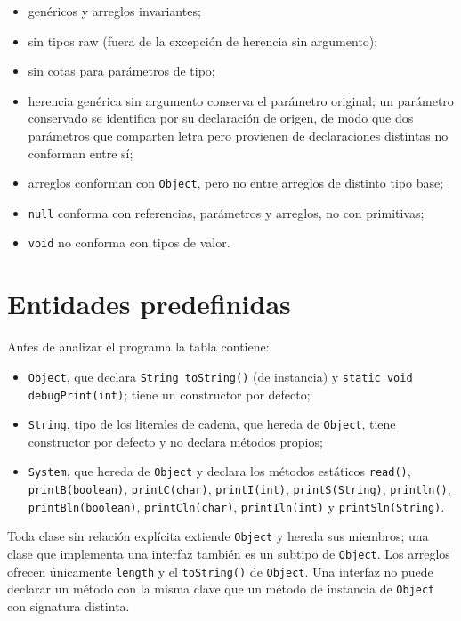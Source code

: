 \documentclass[11pt,a4paper]{article}
\begin{document}
\begin{itemize}
  \item genéricos y arreglos invariantes;
  \item sin tipos raw (fuera de la excepción de herencia sin argumento);
  \item sin cotas para parámetros de tipo;
  \item herencia genérica sin argumento conserva el parámetro original; un
        parámetro conservado se identifica por su declaración de origen, de modo
        que dos parámetros que comparten letra pero provienen de declaraciones
        distintas no conforman entre sí;
  \item arreglos conforman con \texttt{Object}, pero no entre arreglos de distinto
        tipo base;
  \item \texttt{null} conforma con referencias, parámetros y arreglos, no con
        primitivas;
  \item \texttt{void} no conforma con tipos de valor.
\end{itemize}

\section{Entidades predefinidas}

Antes de analizar el programa la tabla contiene:

\begin{itemize}
  \item \texttt{Object}, que declara \texttt{String toString()} (de instancia) y
        \texttt{static void debugPrint(int)}; tiene un constructor por defecto;
  \item \texttt{String}, tipo de los literales de cadena, que hereda de
        \texttt{Object}, tiene constructor por defecto y no declara métodos
        propios;
  \item \texttt{System}, que hereda de \texttt{Object} y declara los métodos
        estáticos \texttt{read()}, \texttt{printB(boolean)}, \texttt{printC(char)},
        \texttt{printI(int)}, \texttt{printS(String)}, \texttt{println()},
        \texttt{printBln(boolean)}, \texttt{printCln(char)}, \texttt{printIln(int)}
        y \texttt{printSln(String)}.
\end{itemize}

Toda clase sin relación explícita extiende \texttt{Object} y hereda sus miembros;
una clase que implementa una interfaz también es un subtipo de \texttt{Object}.
Los arreglos ofrecen únicamente \texttt{length} y el \texttt{toString()} de
\texttt{Object}. Una interfaz no puede declarar un método con la misma clave que
un método de instancia de \texttt{Object} con signatura distinta.
\end{document}
